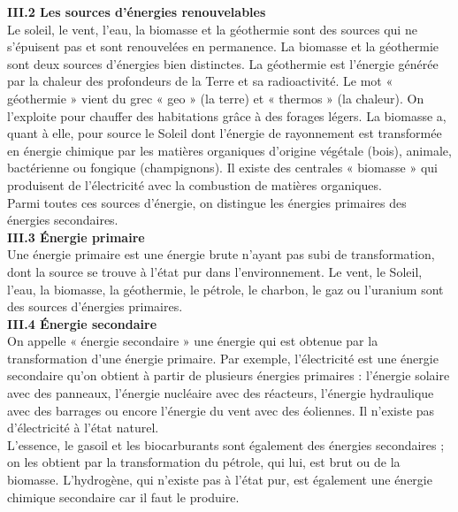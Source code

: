 \documentclass[8pt]{article}
\begin{document}
\textbf{III.2 Les sources d'énergies renouvelables}\\

Le soleil, le vent, l’eau, la biomasse et la géothermie sont des sources qui ne s’épuisent pas et sont renouvelées en permanence. La biomasse et la géothermie sont deux sources d’énergies bien distinctes.
La géothermie est l’énergie générée par la chaleur des profondeurs de la Terre et sa radioactivité. Le mot « géothermie » vient du grec « geo » (la terre) et « thermos » (la chaleur). On l’exploite pour chauffer des habitations grâce à des forages légers. 
La biomasse a, quant à elle, pour source le Soleil dont l’énergie de rayonnement est transformée en énergie chimique par les matières organiques d’origine végétale (bois), animale, bactérienne ou fongique (champignons). Il existe des centrales « biomasse » qui produisent de l’électricité avec la combustion de matières organiques.  \\

Parmi toutes ces sources d’énergie, on distingue les énergies primaires des énergies secondaires.\\

\textbf{III.3 Énergie primaire}\\

Une énergie primaire est une énergie brute n’ayant pas subi de transformation, dont la source se trouve à l’état pur dans l’environnement. Le vent, le Soleil, l’eau, la biomasse, la géothermie, le pétrole, le charbon, le gaz ou l’uranium sont des sources d’énergies primaires.\\

\textbf{III.4 Énergie secondaire}\\

On appelle « énergie secondaire » une énergie qui est obtenue par la transformation d’une énergie primaire. 
Par exemple, l’électricité est une énergie secondaire qu’on obtient à partir de plusieurs énergies primaires : l’énergie solaire avec des panneaux, l’énergie nucléaire avec des réacteurs, l’énergie hydraulique avec des barrages ou encore l’énergie du vent avec des éoliennes. Il n’existe pas d’électricité à l’état naturel.\\

L’essence, le gasoil et les biocarburants sont également des énergies secondaires ; on les obtient par la transformation du pétrole, qui lui, est brut ou de la biomasse. L’hydrogène, qui n'existe pas à l'état pur, est également une énergie chimique secondaire car il faut le produire.\\
\end{document}
